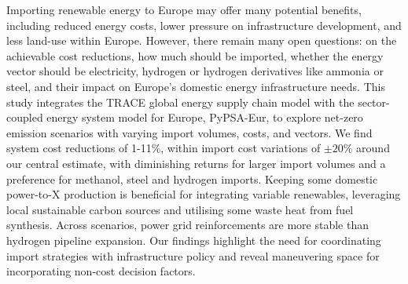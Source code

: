 Importing renewable energy to Europe may offer many potential benefits,
including reduced energy costs, lower pressure on infrastructure development,
and less land-use within Europe. However, there remain many open questions: on
the achievable cost reductions, how much should be imported, whether the energy
vector should be electricity, hydrogen or hydrogen derivatives like ammonia or
steel, and their impact on Europe's domestic energy infrastructure needs. This
study integrates the TRACE global energy supply chain model with the
sector-coupled energy system model for Europe, PyPSA-Eur, to explore net-zero
emission scenarios with varying import volumes, costs, and vectors. We find
system cost reductions of 1-11\%, within import cost variations of $\pm20\%$
around our central estimate, with diminishing returns for larger import volumes
and a preference for methanol, steel and hydrogen imports. Keeping some domestic
power-to-X production is beneficial for integrating variable renewables,
leveraging local sustainable carbon sources and utilising some waste heat from
fuel synthesis. Across scenarios, power grid reinforcements are more stable than
hydrogen pipeline expansion. Our findings highlight the need for coordinating
import strategies with infrastructure policy and reveal maneuvering space for
incorporating non-cost decision factors. 